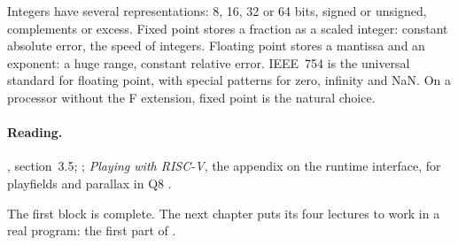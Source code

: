 Integers have several representations: 8, 16, 32 or 64 bits, signed or
unsigned, complements or excess. Fixed point stores a fraction as a scaled
integer: constant absolute error, the speed of integers. Floating point
stores a mantissa and an exponent: a huge range, constant relative error.
IEEE~754 is the universal standard for floating point, with special patterns
for zero, infinity and NaN. On a processor without the F extension, fixed
point is the natural choice.

\paragraph{Reading.} \citet{patterson2020}, section~3.5;
\citet{goldberg1991}; \emph{Playing with RISC-V}, the appendix on the runtime
interface, for playfields and parallax in Q8 \citep{prg32textbook}.

The first block is complete. The next chapter puts its four lectures to work
in a real program: the first part of \vermone.
